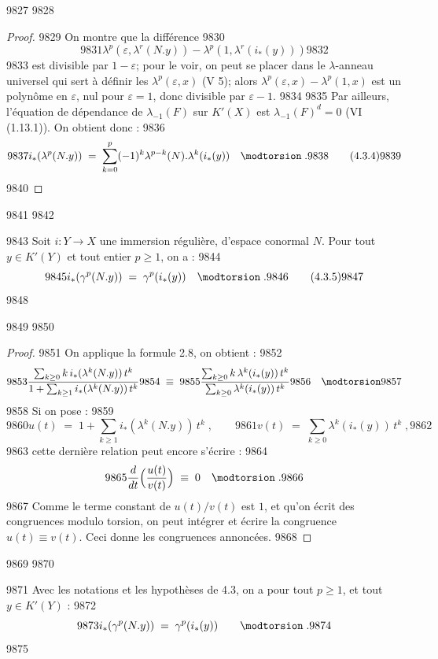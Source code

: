   9827	
  9828	\begin{proof}
  9829	On montre que la différence
  9830	\[
  9831	\lambda^p(\varepsilon, \lambda^r(N.y)) - \lambda^p(1, \lambda^r(i_*(y)))
  9832	\]
  9833	est divisible par $1-\varepsilon$; pour le voir, on peut se placer dans le $\lambda$-anneau universel qui sert à définir les $\lambda^p(\varepsilon,x)$ (V 5); alors $\lambda^p(\varepsilon,x) - \lambda^p(1,x)$ est un polynôme en $\varepsilon$, nul pour $\varepsilon=1$, donc divisible par $\varepsilon-1$.
  9834	
  9835	Par ailleurs, l'équation de dépendance de $\lambda_{-1}(F)$ sur $K'(X)$ est $\lambda_{-1}(F)^d = 0$ (VI (1.13.1)). On obtient donc :
  9836	\[
  9837	i_*(\lambda^p(N.y)) \; = \; \sum_{k=0}^{p} (-1)^k \lambda^{p-k}(N) . \lambda^k(i_*(y)) \quad \modtorsion\; .
  9838	\tag{4.3.4}
  9839	\]
  9840	\end{proof}
  9841	
  9842	\begin{theoreme}[4.3]%
  9843	Soit $i : Y \to X$ une immersion régulière, d'espace conormal $N$. Pour tout $y \in K'(Y)$ et tout entier $p \geq 1$, on a :
  9844	\[
  9845	i_*(\gamma^p(N.y)) \; = \; \gamma^p(i_*(y)) \quad \modtorsion\; .
  9846	\tag{4.3.5}
  9847	\]
  9848	\end{theoreme}
  9849	
  9850	\begin{proof}
  9851	On applique la formule 2.8, on obtient :
  9852	\[
  9853	\frac{\sum_{k \geq 0} k\, i_*(\lambda^k(N.y))\, t^k}{1 + \sum_{k \geq 1} i_*(\lambda^k(N.y))\, t^k}
  9854	\; \equiv \;
  9855	\frac{\sum_{k \geq 0} k\, \lambda^k(i_*(y))\, t^k}{\sum_{k \geq 0} \lambda^k(i_*(y))\, t^k}
  9856	\quad \modtorsion
  9857	\]
  9858	Si on pose :
  9859	\[
  9860	u(t) \; = \; 1 + \sum_{k \geq 1} i_*(\lambda^k(N.y))\, t^k\; , \qquad
  9861	v(t) \; = \; \sum_{k \geq 0} \lambda^k(i_*(y))\, t^k\; ,
  9862	\]
  9863	cette dernière relation peut encore s'écrire :
  9864	\[
  9865	\frac{d}{dt}\Bigl(\frac{u(t)}{v(t)}\Bigr) \; \equiv \; 0 \quad \modtorsion\; .
  9866	\]
  9867	Comme le terme constant de $u(t)/v(t)$ est $1$, et qu'on écrit des congruences modulo torsion, on peut intégrer et écrire la congruence $u(t) \equiv v(t)$. Ceci donne les congruences annoncées.
  9868	\end{proof}
  9869	
  9870	\begin{corollaire}[4.4]%
  9871	Avec les notations et les hypothèses de 4.3, on a pour tout $p \geq 1$, et tout $y \in K'(Y)$ :
  9872	\[
  9873	i_*(\gamma^p(N.y)) \; = \; \gamma^p(i_*(y)) \qquad \modtorsion\; .
  9874	\]
  9875	\end{corollaire}
